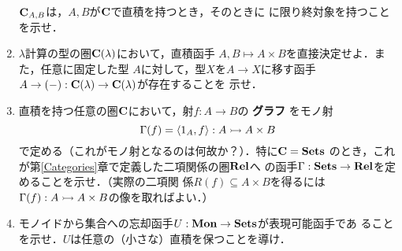 \begin{enumerate}
       ${\bf C}_{A, B}$は，$A, B$が${\bf C}$で直積を持つとき，そのときに
       に限り終対象を持つことを示せ．
 \item $\lambda$計算の型の圏${\bf C}(\lambda)$において，直積函手
       $A, B \mapsto A \times B$を直接決定せよ．また，任意に固定した型
       $A$に対して，型$X$を$A \to X$に移す函手
       $A \to (-):{\bf C}(\lambda) \to {\bf C}(\lambda)$が存在することを
       示せ．
 \item 直積を持つ任意の圏${\bf C}$において，射$f: A \to B$の{\bfseries
       グラフ} をモノ射
       \[
	\Gamma(f) = \langle 1_A, f \rangle : A \rightarrowtail A \times B
       \]
       で定める（これがモノ射となるのは何故か？）．特に${\bf C} = \mathbf{Sets}$
       のとき，これが第\ref{Categories}章で定義した二項関係の圏$\mathbf{Rel}$へ
       の函手$\Gamma : \mathbf{Sets} \to \mathbf{Rel}$を定めることを示せ．（実際の二項関
       係$R(f) \subseteq A \times B $を得るには
       $\Gamma(f): A \rightarrowtail A \times B$の像を取ればよい．）
 \item モノイドから集合への忘却函手$U: \mathbf{Mon} \to \mathbf{Sets}$が表現可能函手であ
       ることを示せ．$U$は任意の（小さな）直積を保つことを導け．
\end{enumerate}
